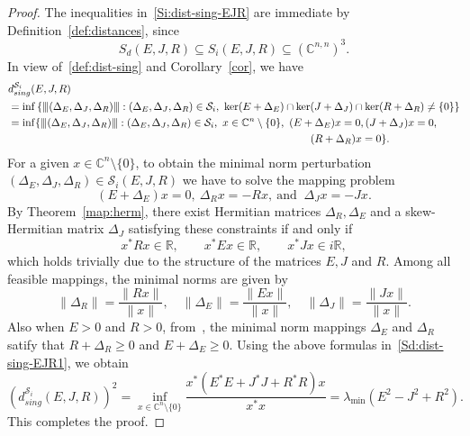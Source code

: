 \documentclass[11pt]{article}
\newcommand{\C}{\mathbb C}
\newcommand{\nnrm}[1]{{\left\vert\kern-0.25ex\left\vert\kern-0.25ex\left\vert #1
		\right\vert\kern-0.25ex\right\vert\kern-0.25ex\right\vert}}
\begin{document}
\begin{proof} The inequalities in~\eqref{Si:dist-sing-EJR} are immediate by Definition~\ref{def:distances}, since
%
\[
S_d(E,J,R) \subseteq S_i(E,J,R) \subseteq (\C^{n,n})^3.
\]
%
In view of~\eqref{def:dist-sing} and Corollary~\ref{cor}, we have
	\begin{align}
		&d_{sing}^{\mathcal S_i}(E,J,R)\nonumber\\
		&=\inf \left\{ \nnrm{(\Delta_E,\Delta_J,\Delta_R)}:(\Delta_E,\Delta_J,\Delta_R)\in \mathcal S_i,~ \ker(E+\Delta_E) \cap \ker(J + \Delta_J) \cap \ker(R+\Delta_R) \neq \{0\} \right\}\nonumber\\
		&=\inf \{ \nnrm{(\Delta_E,\Delta_J,\Delta_R)}:(\Delta_E,\Delta_J,\Delta_R)\in \mathcal S_i,~x\in \C^{n}\setminus\{0\},~ (E+\Delta_E)x=0, (J + \Delta_J)x=0,\nonumber \\
        &\hspace{10cm}(R+\Delta_R)x=0 \}.\label{Sd:dist-sing-EJR1}
	\end{align}
For a given $x\in \C^{n}\setminus \{0\}$, to obtain the minimal norm perturbation $(\Delta_E,\Delta_J,\Delta_R) \in \mathcal S_i(E,J,R)$ we have to solve the mapping problem
	\begin{equation}\label{mapping:constraints}
		(E+\Delta_E)x=0,~ \Delta_Rx=-Rx,~\text{and }~ \Delta_Jx=-Jx.
	\end{equation}
    By Theorem~\ref{map:herm}, there exist Hermitian matrices $\Delta_R,\Delta_E$ and a skew-Hermitian matrix $\Delta_J$ satisfying these constraints if and only if
    \begin{equation*}
        x^*R x \in \mathbb{R}, \qquad x^* E x \in \mathbb{R}, \qquad x^* J x \in i\mathbb{R},
    \end{equation*}
    which holds trivially due to the structure of the matrices $E,J$ and $R$. Among all feasible mappings, the minimal norms are given by
    \begin{equation*}
        \|\Delta_R\| = \frac{\|R x\|}{\|x\|}, \quad
        \|\Delta_E\| = \frac{\|Ex\|}{\|x\|}, \quad
        \|\Delta_J\| = \frac{\|Jx\|}{\|x\|}.
    \end{equation*}
    Also when $E>0$ and $R>0$, from~\cite[Lemma 4.4]{MehMS16}, the minimal norm mappings $\Delta_E$ and $\Delta_R$ satify that $R+\Delta_R \geq 0$ and $E+\Delta_E \geq 0$.
    Using the above formulas in~\eqref{Sd:dist-sing-EJR1}, we obtain
    \begin{equation*}
        (d_{sing}^{\mathcal S_i}(E,J,R))^2=\inf_{x\in \C^{n}\setminus\{0\}} \frac{x^*(E^*E+J^*J+R^*R)x}{x^*x} = \lambda_{\min}(E^2-J^2+R^2).
    \end{equation*}
    This completes the proof.
\end{proof}
\end{document}
